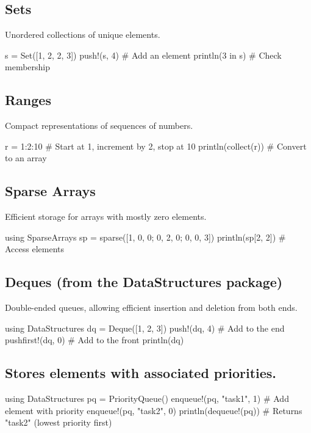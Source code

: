 \documentclass{report}
\begin{document}
    \bigbreak \noindent 
    \subsection{Sets}
    \bigbreak \noindent 
    Unordered collections of unique elements.
    \bigbreak \noindent 
    \begin{jlcode}
        s = Set([1, 2, 2, 3])
        push!(s, 4)  # Add an element
        println(3 in s)  # Check membership
    \end{jlcode}

    \bigbreak \noindent 
    \subsection{Ranges}
    \bigbreak \noindent 
     Compact representations of sequences of numbers.
     \bigbreak \noindent 
     \begin{jlcode}
     r = 1:2:10  # Start at 1, increment by 2, stop at 10
    println(collect(r))  # Convert to an array
     \end{jlcode}

     \bigbreak \noindent 
     \subsection{Sparse Arrays}
     \bigbreak \noindent 
     Efficient storage for arrays with mostly zero elements.
     \bigbreak \noindent 
     \begin{jlcode}
         using SparseArrays
         sp = sparse([1, 0, 0; 0, 2, 0; 0, 0, 3])
         println(sp[2, 2])  # Access elements
     \end{jlcode}

     \bigbreak \noindent 
     \subsection{Deques (from the DataStructures package)}
     \bigbreak \noindent 
     Double-ended queues, allowing efficient insertion and deletion from both ends.
     \bigbreak \noindent 
     \begin{jlcode}
         using DataStructures
         dq = Deque([1, 2, 3])
         push!(dq, 4)  # Add to the end
         pushfirst!(dq, 0)  # Add to the front
         println(dq)
     \end{jlcode}

     \bigbreak \noindent 
     \subsection{Stores elements with associated priorities.}
     \bigbreak \noindent 
     \begin{jlcode}
         using DataStructures
         pq = PriorityQueue()
         enqueue!(pq, "task1", 1)  # Add element with priority
         enqueue!(pq, "task2", 0)
         println(dequeue!(pq))  # Returns "task2" (lowest priority first)
     \end{jlcode}
\end{document}
